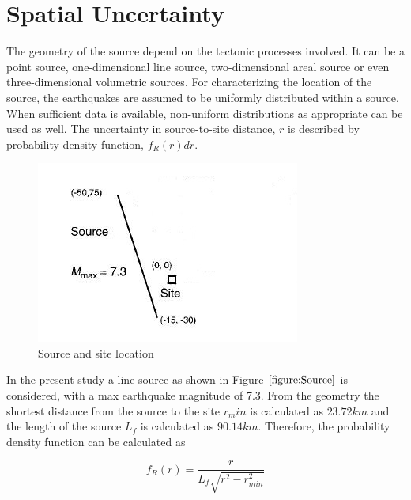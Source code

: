 \documentclass[a4paper,english,12pt]{article}
\begin{document}
\section{Spatial Uncertainty}
The geometry of the source depend on the tectonic processes involved. It can be a point source, one-dimensional line source, two-dimensional areal source or even three-dimensional volumetric sources. For characterizing the location of the source, the earthquakes are assumed to be uniformly distributed within a source. When sufficient data is available, non-uniform distributions as appropriate can be used as well. The uncertainty in source-to-site distance, $r$ is described by probability density function, $f_R (r) dr$.

\begin{figure}[h!]
\graphicspath{ {images/} }
\includegraphics[width=\textwidth]{source}
\caption{Source and site location}
\label{figure:Source}
\centering
\end{figure}

In the present study a line source as shown in Figure $\ref{figure:Source}$ is considered, with a max earthquake magnitude of 7.3. From the geometry the shortest distance from the source to the site $r_min$ is calculated as $23.72 km$ and the length of the source $L_f$ is calculated as $90.14 km$. Therefore, the probability density function can be calculated as 

$$f_R (r) = \frac{r}{L_f \sqrt{r^2 - r_{min}^2}}$$
\end{document}
